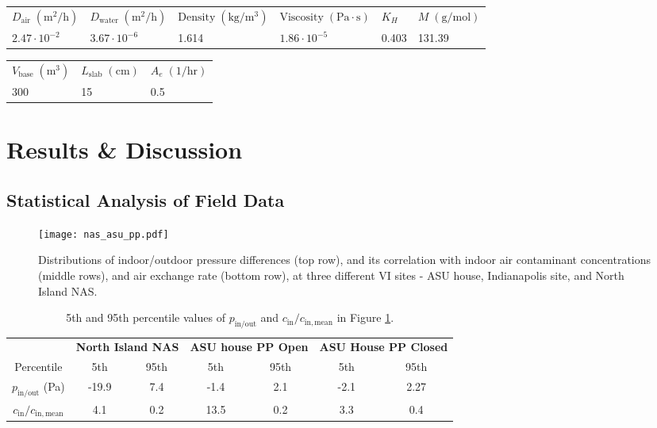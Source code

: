 \documentclass[journal=esthag,manuscript=article]{achemso}
\begin{document}
\begin{table}[htb!]
  \begin{tabular}{l l l l l l}
    \toprule
    $D_\mathrm{air} \; \mathrm{(m^2/h)}$  & $D_\mathrm{water} \; \mathrm{(m^2/h)}$  & $\mathrm{Density} \; \mathrm{(kg/m^3)}$ & $\mathrm{Viscosity} \; \mathrm{(Pa \cdot s)}$  & $K_H$ & $M \; \mathrm{(g/mol)}$ \\
    $2.47 \cdot 10^{-2}$  & $3.67 \cdot 10^{-6}$  & 1.614 & $1.86 \cdot 10^{-5}$  & 0.403 & 131.39 \\
    \bottomrule
  \end{tabular}
  \bigskip
  \begin{tabular}{l l l}
    \toprule
    $V_\mathrm{base} \; \mathrm{(m^3)}$  & $L_\mathrm{slab} \; \mathrm{(cm)}$  & $A_e \; \mathrm{(1/hr)}$ \\
    300  &  15  & 0.5 \\
    \bottomrule
  \end{tabular}
\end{table}

\section{Results \& Discussion}

\subsection{Statistical Analysis of Field Data}

\begin{figure}[htb!]
		\centering
    \caption{Distributions of indoor/outdoor pressure differences (top row), and its correlation with indoor air contaminant concentrations (middle rows), and air exchange rate (bottom row), at three different VI sites - ASU house, Indianapolis site, and North Island NAS.}
    \label{fig:kde}
    \texttt{[image: nas\_asu\_pp.pdf]}
\end{figure}

\begin{table}[htb!]
  \caption{5th and 95th percentile values of $p_\mathrm{in/out}$ and $c_\mathrm{in}/c_\mathrm{in,mean}$ in Figure \ref{fig:kde}.}\label{tbl:percentiles}
  \begin{tabular}{c c c c c c c}
    \toprule
    & \multicolumn{2}{c|}{\textbf{North Island NAS}} & \multicolumn{2}{c|}{\textbf{ASU house PP Open}} & \multicolumn{2}{c}{\textbf{ASU House PP Closed}} \\
    Percentile & 5th & 95th & 5th & 95th & 5th & 95th \\
    $p_\mathrm{in/out}$ (Pa) & -19.9 & 7.4 & -1.4 & 2.1 & -2.1 & 2.27 \\
    $c_\mathrm{in}/c_\mathrm{in,mean}$ & 4.1 & 0.2 & 13.5 & 0.2 & 3.3 & 0.4 \\
    \bottomrule
  \end{tabular}
\end{table}
\end{document}
